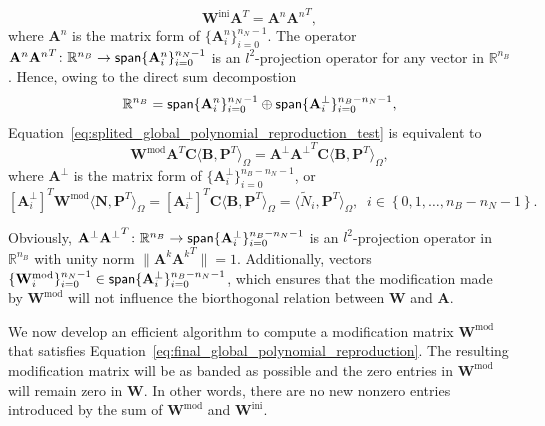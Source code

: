 \begin{equation}
	\mathbf{W}^\text{ini}\mathbf{A}^T=\mathbf{A}^n{\mathbf{A}^n}^T,
\end{equation}
where $\mathbf{A}^n$ is the matrix form of $\{\mathbf{A}^n_i\}_{i=0}^{n_N-1}$. The operator $\mathbf{A}^n{\mathbf{A}^n}^T\colon\mathbb{R}^{n_B}\rightarrow\operatorname{\mathsf{span}}\{\mathbf{A}^n_i\}_{i=0}^{n_N-1}$ is an $l^2$-projection operator for any vector in $\mathbb{R}^{n_B}$. Hence, owing to the direct sum decompostion
\begin{equation}
	\mathbb{R}^{n_B}=\operatorname{\mathsf{span}}\{\mathbf{A}^n_i\}_{i=0}^{n_N-1}\oplus\operatorname{\mathsf{span}}\{\mathbf{A}^\perp_i\}_{i=0}^{n_B-n_N-1},
\end{equation}
Equation~\eqref{eq:splited_global_polynomial_reproduction_test} is equivalent to
\begin{equation}
	\mathbf{W}^\text{mod}\mathbf{A}^T\mathbf{C}\langle\mathbf{B},\mathbf{P}^T\rangle_\Omega=\mathbf{A}^\perp{\mathbf{A}^\perp}^T\mathbf{C}\langle\mathbf{B},\mathbf{P}^T\rangle_\Omega,
\end{equation}
where $\mathbf{A}^\perp$ is the matrix form of $\{\mathbf{A}^\perp_i\}_{i=0}^{n_B-n_N-1}$, or
\begin{equation}
	\left[\mathbf{A}^\perp_i\right]^T\mathbf{W}^\text{mod}\langle\mathbf{N},\mathbf{P}^T\rangle_\Omega = \left[\mathbf{A}^\perp_i\right]^T\mathbf{C}\langle\mathbf{B},\mathbf{P}^T\rangle_\Omega=\langle \tilde{N}_i,\mathbf{P}^T\rangle_\Omega,\;\; i\in\left\{0,1,\dots,n_B-n_N-1\right\}. \label{eq:final_global_polynomial_reproduction}
\end{equation}

\begin{remark}
	Obviously, $\mathbf{A}^\perp{\mathbf{A}^\perp}^T\colon\mathbb{R}^{n_B}\rightarrow\operatorname{\mathsf{span}}\{\mathbf{A}^\perp_i\}_{i=0}^{n_B-n_N-1}$ is an $l^2$-projection operator in $\mathbb{R}^{n_B}$ with unity norm $\|\mathbf{A}^k{\mathbf{A}^k}^T\|=1$. Additionally, vectors $\{\mathbf{W}_i^\text{mod}\}_{i=0}^{n_N-1}\in\operatorname{\mathsf{span}}\{\mathbf{A}^\perp_i\}_{i=0}^{n_B-n_N-1}$, which ensures that the modification made by $\mathbf{W}^\text{mod}$ will not influence the biorthogonal relation between $\mathbf{W}$ and $\mathbf{A}$.
\end{remark}



We now develop an efficient algorithm to compute a modification matrix $\mathbf{W}^\text{mod}$ that satisfies Equation~\eqref{eq:final_global_polynomial_reproduction}. The resulting modification matrix will be as banded as possible and the zero entries in $\mathbf{W}^\text{mod}$ will remain zero in $\mathbf{W}$. In other words, there are no new nonzero entries introduced by the sum of $\mathbf{W}^\text{mod}$ and $\mathbf{W}^\text{ini}$.


